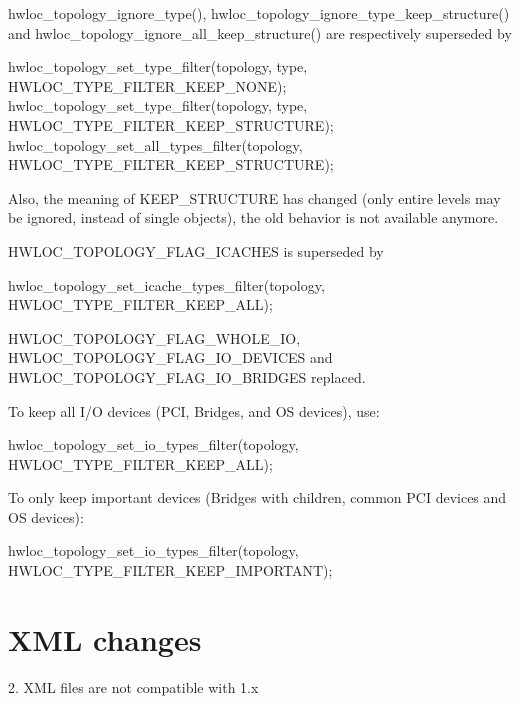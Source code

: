 \begin{DoxyItemize}
\item hwloc\+\_\+topology\+\_\+ignore\+\_\+type(), hwloc\+\_\+topology\+\_\+ignore\+\_\+type\+\_\+keep\+\_\+structure() and hwloc\+\_\+topology\+\_\+ignore\+\_\+all\+\_\+keep\+\_\+structure() are respectively superseded by \begin{DoxyVerb}hwloc_topology_set_type_filter(topology, type, HWLOC_TYPE_FILTER_KEEP_NONE);
hwloc_topology_set_type_filter(topology, type, HWLOC_TYPE_FILTER_KEEP_STRUCTURE);
hwloc_topology_set_all_types_filter(topology, HWLOC_TYPE_FILTER_KEEP_STRUCTURE);
\end{DoxyVerb}


Also, the meaning of K\+E\+E\+P\+\_\+\+S\+T\+R\+U\+C\+T\+U\+RE has changed (only entire levels may be ignored, instead of single objects), the old behavior is not available anymore. 


\item H\+W\+L\+O\+C\+\_\+\+T\+O\+P\+O\+L\+O\+G\+Y\+\_\+\+F\+L\+A\+G\+\_\+\+I\+C\+A\+C\+H\+ES is superseded by \begin{DoxyVerb}hwloc_topology_set_icache_types_filter(topology, HWLOC_TYPE_FILTER_KEEP_ALL);
\end{DoxyVerb}
 


\item H\+W\+L\+O\+C\+\_\+\+T\+O\+P\+O\+L\+O\+G\+Y\+\_\+\+F\+L\+A\+G\+\_\+\+W\+H\+O\+L\+E\+\_\+\+IO, H\+W\+L\+O\+C\+\_\+\+T\+O\+P\+O\+L\+O\+G\+Y\+\_\+\+F\+L\+A\+G\+\_\+\+I\+O\+\_\+\+D\+E\+V\+I\+C\+ES and H\+W\+L\+O\+C\+\_\+\+T\+O\+P\+O\+L\+O\+G\+Y\+\_\+\+F\+L\+A\+G\+\_\+\+I\+O\+\_\+\+B\+R\+I\+D\+G\+ES replaced.

To keep all I/O devices (P\+CI, Bridges, and OS devices), use\+: \begin{DoxyVerb}hwloc_topology_set_io_types_filter(topology, HWLOC_TYPE_FILTER_KEEP_ALL);
\end{DoxyVerb}


To only keep important devices (Bridges with children, common P\+CI devices and OS devices)\+: \begin{DoxyVerb}hwloc_topology_set_io_types_filter(topology, HWLOC_TYPE_FILTER_KEEP_IMPORTANT);
\end{DoxyVerb}
 


\end{DoxyItemize}

 \hypertarget{a00395_upgrade_to_api_2x_xml}{}\section{X\+M\+L changes}\label{a00395_upgrade_to_api_2x_xml}
2. X\+ML files are not compatible with 1.\+x

